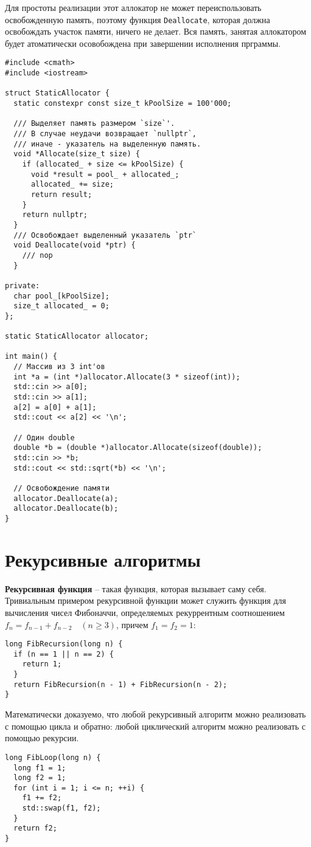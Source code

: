 Для простоты реализации этот аллокатор не может переиспользовать освобожденную память,
поэтому функция \verb|Deallocate|, которая должна освобождать участок памяти, ничего не
делает. Вся память, занятая аллокатором будет атоматически осовобождена при завершении исполнения прграммы.
\begin{verbatim}
#include <cmath>
#include <iostream>

struct StaticAllocator {
  static constexpr const size_t kPoolSize = 100'000;

  /// Выделяет память размером `size`'.
  /// В случае неудачи возвращает `nullptr`,
  /// иначе - указатель на выделенную память.
  void *Allocate(size_t size) {
    if (allocated_ + size <= kPoolSize) {
      void *result = pool_ + allocated_;
      allocated_ += size;
      return result;
    }
    return nullptr;
  }
  /// Освобождает выделенный указатель `ptr`
  void Deallocate(void *ptr) {
    /// nop
  }

private:
  char pool_[kPoolSize];
  size_t allocated_ = 0;
};

static StaticAllocator allocator;

int main() {
  // Массив из 3 int'ов
  int *a = (int *)allocator.Allocate(3 * sizeof(int));
  std::cin >> a[0];
  std::cin >> a[1];
  a[2] = a[0] + a[1];
  std::cout << a[2] << '\n';

  // Один double
  double *b = (double *)allocator.Allocate(sizeof(double));
  std::cin >> *b;
  std::cout << std::sqrt(*b) << '\n';

  // Освобождение памяти
  allocator.Deallocate(a);
  allocator.Deallocate(b);
}
\end{verbatim}

\section{Рекурсивные алгоритмы}
\textbf{Рекурсивная функция} -- такая функция, которая вызывает саму себя.
Тривиальным примером рекурсивной функции может служить функция для вычисления
чисел Фибоначчи, определяемых рекуррентным соотношением $f_n = f_{n-1} + f_{n-2} \quad (n \geq 3)$, причем $f_1 = f_2 = 1$:
\begin{verbatim}
long FibRecursion(long n) {
  if (n == 1 || n == 2) {
    return 1;
  }
  return FibRecursion(n - 1) + FibRecursion(n - 2);
}  
\end{verbatim}

Математически доказуемо, что любой рекурсивный алгоритм можно реализовать с помощью цикла
и обратно: любой циклический алгоритм можно реализовать с помощью рекурсии.
\begin{verbatim}
long FibLoop(long n) {
  long f1 = 1;
  long f2 = 1;
  for (int i = 1; i <= n; ++i) {
    f1 += f2;
    std::swap(f1, f2);
  }
  return f2;
}
\end{verbatim}

